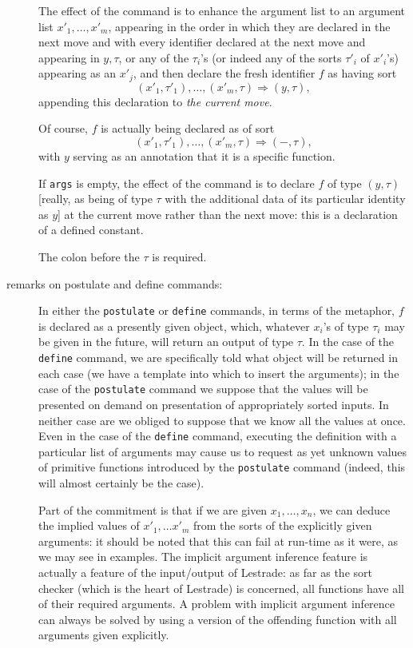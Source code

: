 \documentclass[12pt]{article}
\begin{document}
\begin{description}
  The effect of the command is to enhance the argument list
to an argument list $x'_1,\ldots,x'_m$, appearing in the order in which they are declared in the next move and with every identifier declared at the next
move and appearing in $y, \tau$, or any of the $\tau_i$'s (or indeed any of the sorts $\tau'_i$ of $x'_i$'s) appearing as an $x'_j$, and then declare the fresh identifier $f$
as having sort $$(x'_1,\tau'_1),\ldots,(x'_m,\tau)\Rightarrow (y,\tau),$$ appending this declaration to {\em the current move\/}.  

Of course, $f$ is actually being declared as of sort  $$(x'_1,\tau'_1),\ldots,(x'_m,\tau)\Rightarrow (-,\tau),$$ with $y$ serving as an annotation that it is a specific function.

If {\tt args} is empty, the effect of the command is to declare $f$ of type $(y,\tau)$ [really, as being of type $\tau$ with the additional data of its particular identity as $y$] at the current move rather than the next move:  this is a declaration of a defined constant.  

The colon before the $\tau$ is required.

\item[remarks on postulate and define commands:]  In either the {\tt postulate} or {\tt define} commands, in terms of the metaphor,
$f$ is declared as a presently given object, which, whatever $x_i$'s of type $\tau_i$ may be given in the future, will return an output of type $\tau$.  In the case of the {\tt define} command, we are specifically told what object will be returned in each case (we have a template into which to insert the arguments);  in the case of the {\tt postulate} command we suppose that the values will be presented on demand on presentation of appropriately sorted inputs.  In neither case are we obliged to suppose that we know all the values at once.  Even in the case of the {\tt define} command, executing the definition with a particular list of arguments may cause us to request as yet unknown values of primitive functions introduced by the {\tt postulate} command (indeed, this will almost certainly be the case).  

Part of the commitment is that if we are given $x_1,\ldots,x_n$, we can deduce the implied values of $x'_1,\ldots x'_m$ from the sorts of the explicitly given arguments:  it should be noted that this can fail at run-time as it were, as we may see in examples. The implicit argument inference feature is actually a feature of the input/output of Lestrade:  as far as the sort checker (which is the heart of Lestrade)  is concerned, all functions have all of their required arguments.  A problem with implicit argument inference can always be solved by using a version of the offending function with all arguments given explicitly.


\end{description}
\end{document}
